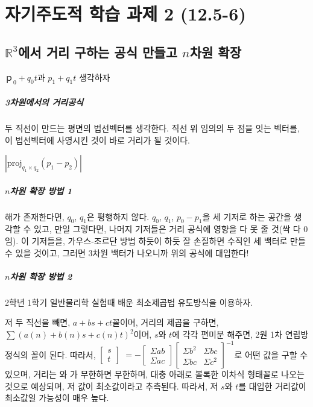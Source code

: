 
\chapter{자기주도적 학습 과제 2 (12.5-6)}

\section{$\mathbb{R}^3$에서 거리 구하는 공식 만들고 $n$차원 확장}

$ｐ _{0} + q _{0} t$과  $p _{1} + q _{1} t$ 생각하자

\paragraph{3차원에서의 거리공식}
두 직선이 만드는 평면의 법선벡터를 생각한다. 직선 위 임의의 두 점을 잇는 벡터를, 
이 법선벡터에 사영시킨 것이 바로 거리가 될 것이다.

$\left| \mathrm{proj} _{q _1 \times  q _{2}} ( p _{1} - p _{2} ) \right|$

\paragraph{$n$차원 확장 방법 1}

해가 존재한다면, $q_0$, $q_1$은 평행하지 않다.
$q_0$, $q_1$, $p_0 - p_1$을 세 기저로 하는 공간을 생각할 수 있고,
만일 그렇다면, 나머지 기저들은 거리 공식에 영향을 다 못 줄 것(싹 다 0임). 
이 기저들을, 가우스-조르단 방법 하듯이 하듯 잘 손질하면 
수직인 세 백터로 만들 수 있을 것이고, 그러면 3차원 백터가 나오니까 위의 공식에 대입한다!

\paragraph{$n$차원 확장 방법 2}
2학년 1학기 일반물리학 실험때 배운 최소제곱법 유도방식을 이용하자.

저 두 직선을 빼면, $a+bs+ct$꼴이며, 거리의 제곱을 구하면, $\sum \left( a(n) + b(n)s + c(n) t \right)^2 $이며,
$s$와 $t$에 각각 편미분 해주면, 2원 1차 연립방정식의 꼴이 된다. 따라서, 
$\begin{bmatrix} s \\t \end{bmatrix}$ $ =- \begin{bmatrix} \Sigma  ab \\ \Sigma  ac  \end{bmatrix} \begin{bmatrix} \Sigma  b ^{2}& \Sigma  bc \\ \Sigma  bc& \Sigma  c ^{2} \end{bmatrix}  ^{-1} $로 어떤 값을 구할 수 있으며, 거리는 와 가 무한하면 무한하며, 대충 아래로 볼록한 이차식 형태꼴로 나오는 것으로 예상되며, 저 값이 최소값이라고 추측된다.
따라서, 저 $s$와 $t$를 대입한 거리값이 최소값일 가능성이 매우 높다.


